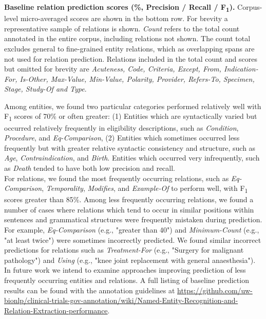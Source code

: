 \documentclass[../main.tex]{subfiles}
\begin{document}
\begin{table*}
    \centering
    
    \caption{\textbf{Baseline relation prediction scores (\%, Precision / Recall / F\textsubscript{1}).} Corpus-level micro-averaged scores are shown in the bottom row. For brevity a representative sample of relations is shown. \textit{Count} refers to the total count annotated in the entire corpus, including relations not shown. The count total excludes general to fine-grained entity relations, which as overlapping spans are not used for relation prediction. Relations included in the total count and scores but omitted for brevity are \textit{Acuteness, Code, Criteria, Except, From, Indication-For, Is-Other, Max-Value, Min-Value, Polarity, Provider, Refers-To, Specimen, Stage, Study-Of and Type}.}
    \label{relation_f1}
\end{table*}

\noindent Among entities, we found two particular categories performed relatively well with F\textsubscript{1} scores of 70\% or often greater: (1) Entities which are syntactically varied but occurred relatively frequently in eligibility descriptions, such as \textit{Condition}, \textit{Procedure}, and \textit{Eq-Comparison}, (2) Entities which sometimes occurred less frequently but with greater relative syntactic consistency and structure, such as \textit{Age}, \textit{Contraindication}, and \textit{Birth}. Entities which occurred very infrequently, such as \textit{Death} tended to have both low precision and recall. \\

\noindent For relations, we found the most frequently occurring relations, such as \textit{Eq-Comparison}, \textit{Temporality}, \textit{Modifies}, and \textit{Example-Of} to perform well, with F\textsubscript{1} scores greater than 85\%. Among less frequently occurring relations, we found a number of cases where relations which tend to occur in similar positions within sentences and grammatical structures were frequently mistaken during prediction. For example, \textit{Eq-Comparison} (e.g., "greater than 40") and \textit{Minimum-Count} (e.g., "at least twice") were sometimes incorrectly predicted. We found similar incorrect predictions for relations such as \textit{Treatment-For} (e.g., "Surgery for malignant pathology") and \textit{Using} (e.g., "knee joint replacement with general anaesthesia"). \\

\noindent In future work we intend to examine approaches improving prediction of less frequently occurring entities and relations. A full listing of baseline prediction results can be found with the annotation guidelines at \url{https://github.com/uw-bionlp/clinical-trials-gov-annotation/wiki/Named-Entity-Recognition-and-Relation-Extraction-performance}. \\
\end{document}
